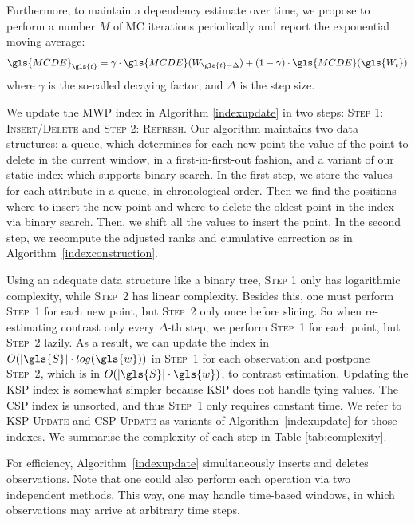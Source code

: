 Furthermore, to maintain a dependency estimate over time, we propose to perform a number $M$ of MC iterations periodically and report the exponential moving average: 
\begin{equation}
    \gls{MCDE}_{\gls{t}} = \gamma \cdot \gls{MCDE}(W_{\gls{t}-\Delta}) + (1-\gamma) \cdot \gls{MCDE}(\gls{W_t}) 
    \label{eq:exp-decay}
\end{equation}
where $\gamma$ is the so-called decaying factor, and $\Delta$ is the step size. 

We update the \gls{MWP} index in Algorithm \ref{indexupdate} in two steps: \textsc{Step 1: Insert/Delete} and \textsc{Step 2: Refresh}. 
Our algorithm maintains two data structures: a queue, which determines for each new point the value of the point to delete in the current window, in a first-in-first-out fashion, and a variant of our static index which supports binary search. 
In the first step, we store the values for each attribute in a queue, in chronological order. 
Then we find the positions where to insert the new point and where to delete the oldest point in the index via binary search. Then, we shift all the values to insert the point. 
In the second step, we recompute the adjusted ranks and cumulative correction as in Algorithm~\ref{indexconstruction}.

Using an adequate data structure like a binary tree, \textsc{Step 1} only has logarithmic complexity, while \textsc{Step~2} has linear complexity. 
Besides this, one must perform \textsc{Step~1} for each new point, but \textsc{Step~2} only once before slicing. 
So when re-estimating contrast only every $\Delta$-th 
step, we perform \textsc{Step~1} for each point, but \textsc{Step~2} lazily. 
As a result, we can update the index in $O(|\gls{S}| \cdot log(\gls{w}))$ in \textsc{Step~1} for each observation and postpone \textsc{Step~2}, which is in $O(|\gls{S}| \cdot \gls{w})$, to contrast estimation. Updating the \gls{KSP} index is somewhat simpler because \gls{KSP} does not handle tying values. The \gls{CSP} index is unsorted, and thus \textsc{Step~1} only requires constant time. We refer to \textsc{\gls{KSP}-Update} and \textsc{\gls{CSP}-Update} as variants of Algorithm~\ref{indexupdate} for those indexes. We summarise the complexity of each step in Table \ref{tab:complexity}.

For efficiency, Algorithm~\ref{indexupdate} simultaneously inserts and deletes observations. Note that one could also perform each operation via two independent methods. This way, one may handle time-based windows, in which observations may arrive at arbitrary time steps.%

